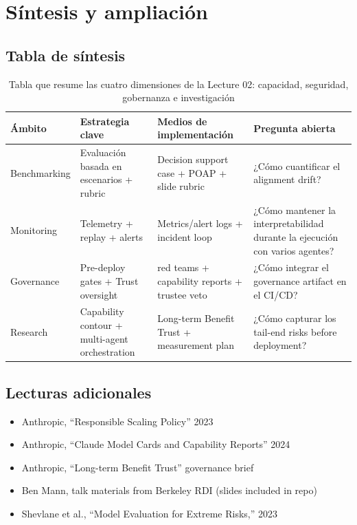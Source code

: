 \section{Síntesis y ampliación}

\subsection{Tabla de síntesis}

\begin{table}[H]
\centering
\begin{tabular}{p{} p{} p{} p{}}
\toprule
Ámbito & Estrategia clave & Medios de implementación & Pregunta abierta \\
\midrule
Benchmarking & Evaluación basada en escenarios + rubric & Decision support case + POAP + slide rubric & ¿Cómo cuantificar el alignment drift? \\
Monitoring & Telemetry + replay + alerts & Metrics/alert logs + incident loop & ¿Cómo mantener la interpretabilidad durante la ejecución con varios agentes? \\
Governance & Pre-deploy gates + Trust oversight & red teams + capability reports + trustee veto & ¿Cómo integrar el governance artifact en el CI/CD? \\
Research & Capability contour + multi-agent orchestration & Long-term Benefit Trust + measurement plan & ¿Cómo capturar los tail-end risks before deployment? \\
\bottomrule
\end{tabular}
\caption{Tabla que resume las cuatro dimensiones de la Lecture 02: capacidad, seguridad, gobernanza e investigación}
\end{table}

\subsection{Lecturas adicionales}

\begin{itemize}
    \item Anthropic, ``Responsible Scaling Policy'' 2023
    \item Anthropic, ``Claude Model Cards and Capability Reports'' 2024
    \item Anthropic, ``Long-term Benefit Trust'' governance brief
    \item Ben Mann, talk materials from Berkeley RDI (slides included in repo)
    \item Shevlane et al., ``Model Evaluation for Extreme Risks,'' 2023
\end{itemize}


